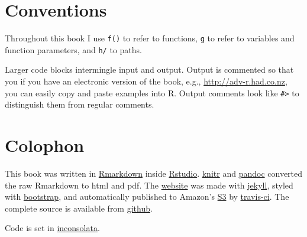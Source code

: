 \section{Conventions}

Throughout this book I use \texttt{f()} to refer to functions,
\texttt{g} to refer to variables and function parameters, and
\texttt{h/} to paths.

Larger code blocks intermingle input and output. Output is commented so
that you if you have an electronic version of the book, e.g.,
\url{http://adv-r.had.co.nz}, you can easily copy and paste examples
into R. Output comments look like \texttt{\#\textgreater{}} to
distinguish them from regular comments. 

\section{Colophon}

This book was written in \href{http://rmarkdown.rstudio.com/}{Rmarkdown}
inside \href{http://www.rstudio.com/ide/}{Rstudio}.
\href{http://yihui.name/knitr/}{knitr} and
\href{http://johnmacfarlane.net/pandoc/}{pandoc} converted the raw
Rmarkdown to html and pdf. The \href{http://adv-r.had.co.nz}{website}
was made with \href{http://jekyllrb.com/}{jekyll}, styled with
\href{http://getbootstrap.com/}{bootstrap}, and automatically published
to Amazon's \href{http://aws.amazon.com/s3/}{S3} by
\href{https://travis-ci.org/}{travis-ci}. The complete source is
available from \href{https://github.com/hadley/adv-r}{github}.

Code is set in
\href{http://levien.com/type/myfonts/inconsolata.html}{inconsolata}.
